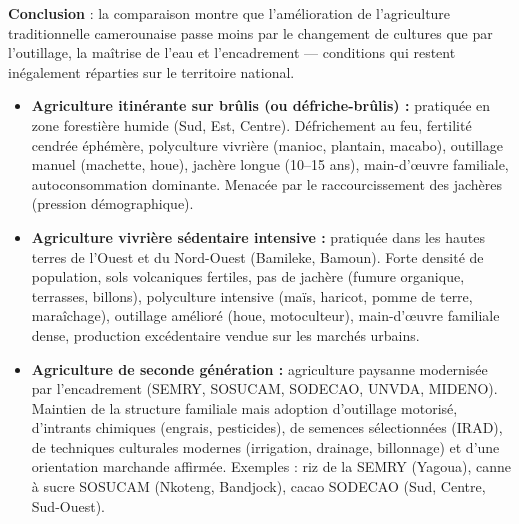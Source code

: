 \documentclass[11pt]{article}
\begin{document}
\begin{exoresolu}
\textbf{Conclusion} : la comparaison montre que l'amélioration de l'agriculture traditionnelle camerounaise passe moins par le changement de cultures que par l'outillage, la maîtrise de l'eau et l'encadrement — conditions qui restent inégalement réparties sur le territoire national.
\end{exoresolu}

\begin{aretenir}
\begin{itemize}
\item \textbf{Agriculture itinérante sur brûlis (ou défriche-brûlis) :} pratiquée en zone forestière humide (Sud, Est, Centre). Défrichement au feu, fertilité cendrée éphémère, polyculture vivrière (manioc, plantain, macabo), outillage manuel (machette, houe), jachère longue (10--15 ans), main-d'œuvre familiale, autoconsommation dominante. Menacée par le raccourcissement des jachères (pression démographique).
\item \textbf{Agriculture vivrière sédentaire intensive :} pratiquée dans les hautes terres de l'Ouest et du Nord-Ouest (Bamileke, Bamoun). Forte densité de population, sols volcaniques fertiles, pas de jachère (fumure organique, terrasses, billons), polyculture intensive (maïs, haricot, pomme de terre, maraîchage), outillage amélioré (houe, motoculteur), main-d'œuvre familiale dense, production excédentaire vendue sur les marchés urbains.
\item \textbf{Agriculture de seconde génération :} agriculture paysanne modernisée par l'encadrement (SEMRY, SOSUCAM, SODECAO, UNVDA, MIDENO). Maintien de la structure familiale mais adoption d'outillage motorisé, d'intrants chimiques (engrais, pesticides), de semences sélectionnées (IRAD), de techniques culturales modernes (irrigation, drainage, billonnage) et d'une orientation marchande affirmée. Exemples : riz de la SEMRY (Yagoua), canne à sucre SOSUCAM (Nkoteng, Bandjock), cacao SODECAO (Sud, Centre, Sud-Ouest).
\end{itemize}
\end{aretenir}
\end{document}
